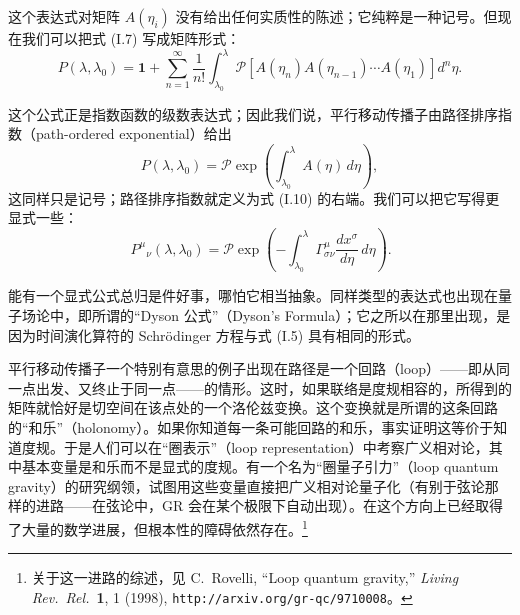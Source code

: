 这个表达式对矩阵 $A(\eta_i)$ 没有给出任何实质性的陈述；它纯粹是一种记号。但现在我们可以把式 (I.7) 写成矩阵形式：
\begin{equation*}
P(\lambda,\lambda_0) = \mathbf{1} + \sum_{n=1}^{\infty} \frac{1}{n!}\int_{\lambda_0}^{\lambda} \mathcal{P}\left[A(\eta_n)A(\eta_{n-1})\cdots A(\eta_1)\right] d^n\eta.
\tag{I.10}
\end{equation*}

这个公式正是指数函数的级数表达式；因此我们说，平行移动传播子由路径排序指数（path-ordered exponential）给出
\begin{equation*}
P(\lambda,\lambda_0) = \mathcal{P}\exp\left(\int_{\lambda_0}^{\lambda} A(\eta)\,d\eta\right),
\tag{I.11}
\end{equation*}
这同样只是记号；路径排序指数就定义为式 (I.10) 的右端。我们可以把它写得更显式一些：
\begin{equation*}
\boxed{\,P^\mu{}_\nu(\lambda,\lambda_0) = \mathcal{P}\exp\left(-\int_{\lambda_0}^{\lambda} \Gamma^\mu_{\sigma\nu}\frac{dx^\sigma}{d\eta}\,d\eta\right).}
\tag{I.12}
\end{equation*}

能有一个显式公式总归是件好事，哪怕它相当抽象。同样类型的表达式也出现在量子场论中，即所谓的“Dyson 公式”（Dyson's Formula）；它之所以在那里出现，是因为时间演化算符的 Schrödinger 方程与式 (I.5) 具有相同的形式。

平行移动传播子一个特别有意思的例子出现在路径是一个回路（loop）——即从同一点出发、又终止于同一点——的情形。这时，如果联络是度规相容的，所得到的矩阵就恰好是切空间在该点处的一个洛伦兹变换。这个变换就是所谓的这条回路的“和乐”（holonomy）。如果你知道每一条可能回路的和乐，事实证明这等价于知道度规。于是人们可以在“圈表示”（loop representation）中考察广义相对论，其中基本变量是和乐而不是显式的度规。有一个名为“圈量子引力”（loop quantum gravity）的研究纲领，试图用这些变量直接把广义相对论量子化（有别于弦论那样的进路——在弦论中，GR 会在某个极限下自动出现）。在这个方向上已经取得了大量的数学进展，但根本性的障碍依然存在。\footnote{关于这一进路的综述，见 C.~Rovelli, “Loop quantum gravity,” \emph{Living Rev.~Rel.}~\textbf{1}, 1 (1998), \texttt{http://arxiv.org/gr-qc/9710008}。}

